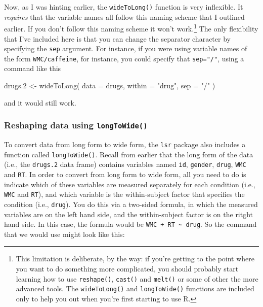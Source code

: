 \documentclass[
]{book}
\newenvironment{Shaded}{\begin{snugshade}}{\end{snugshade}}
\newcommand{\AttributeTok}[1]{\textcolor[rgb]{0.77,0.63,0.00}{#1}}
\newcommand{\FloatTok}[1]{\textcolor[rgb]{0.00,0.00,0.81}{#1}}
\newcommand{\FunctionTok}[1]{\textcolor[rgb]{0.00,0.00,0.00}{#1}}
\newcommand{\NormalTok}[1]{#1}
\newcommand{\OtherTok}[1]{\textcolor[rgb]{0.56,0.35,0.01}{#1}}
\newcommand{\StringTok}[1]{\textcolor[rgb]{0.31,0.60,0.02}{#1}}
\begin{document}
Now, as I was hinting earlier, the \texttt{wideToLong()} function is very inflexible. It \emph{requires} that the variable names all follow this naming scheme that I outlined earlier. If you don't follow this naming scheme it won't work.\footnote{This limitation is deliberate, by the way: if you're getting to the point where you want to do something more complicated, you should probably start learning how to use \texttt{reshape()}, \texttt{cast()} and \texttt{melt()} or some of other the more advanced tools. The \texttt{wideToLong()} and \texttt{longToWide()} functions are included only to help you out when you're first starting to use R.} The only flexibility that I've included here is that you can change the separator character by specifying the \texttt{sep} argument. For instance, if you were using variable names of the form \texttt{WMC/caffeine}, for instance, you could specify that \texttt{sep="/"}, using a command like this

\begin{Shaded}
\begin{Highlighting}[]
\NormalTok{drugs}\FloatTok{.2} \OtherTok{\textless{}{-}} \FunctionTok{wideToLong}\NormalTok{( }\AttributeTok{data =}\NormalTok{ drugs, }\AttributeTok{within =} \StringTok{"drug"}\NormalTok{, }\AttributeTok{sep =} \StringTok{"/"}\NormalTok{ )}
\end{Highlighting}
\end{Shaded}

and it would still work.

\hypertarget{reshaping-data-using-longtowide}{%
\subsubsection{\texorpdfstring{Reshaping data using \texttt{longToWide()}}{Reshaping data using longToWide()}}\label{reshaping-data-using-longtowide}}

To convert data from long form to wide form, the \texttt{lsr} package also includes a function called \texttt{longToWide()}. Recall from earlier that the long form of the data (i.e., the \texttt{drugs.2} data frame) contains variables named \texttt{id}, \texttt{gender}, \texttt{drug}, \texttt{WMC} and \texttt{RT}. In order to convert from long form to wide form, all you need to do is indicate which of these variables are measured separately for each condition (i.e., \texttt{WMC} and \texttt{RT}), and which variable is the within-subject factor that specifies the condition (i.e., \texttt{drug}). You do this via a two-sided formula, in which the measured variables are on the left hand side, and the within-subject factor is on the ritght hand side. In this case, the formula would be \texttt{WMC\ +\ RT\ \textasciitilde{}\ drug}. So the command that we would use might look like this:
\end{document}
